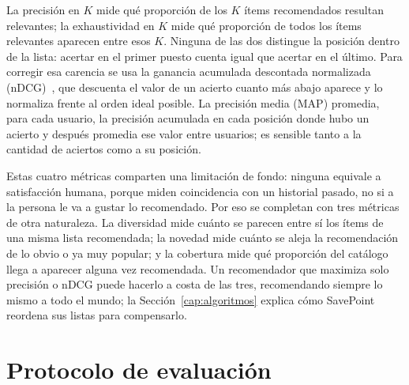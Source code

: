 La precisión en \(K\) mide qué proporción de los \(K\) ítems recomendados resultan relevantes;
la exhaustividad en \(K\) mide qué proporción de todos los ítems relevantes aparecen entre
esos \(K\). Ninguna de las dos distingue la posición dentro de la lista: acertar en el primer
puesto cuenta igual que acertar en el último. Para corregir esa carencia se usa la ganancia
acumulada descontada normalizada (nDCG)~\cite{jarvelin2002cumulated}, que descuenta el valor
de un acierto cuanto más abajo aparece y lo normaliza frente al orden ideal posible. La
precisión media (MAP) promedia, para cada usuario, la precisión acumulada en cada posición
donde hubo un acierto y después promedia ese valor entre usuarios; es sensible tanto a la
cantidad de aciertos como a su posición.

Estas cuatro métricas comparten una limitación de fondo: ninguna equivale a satisfacción
humana, porque miden coincidencia con un historial pasado, no si a la persona le va a gustar lo
recomendado. Por eso se completan con tres métricas de otra naturaleza. La diversidad mide
cuánto se parecen entre sí los ítems de una misma lista recomendada; la novedad mide cuánto se
aleja la recomendación de lo obvio o ya muy popular; y la cobertura mide qué proporción del
catálogo llega a aparecer alguna vez recomendada. Un recomendador que maximiza solo precisión
o nDCG puede hacerlo a costa de las tres, recomendando siempre lo mismo a todo el mundo; la
Sección~\ref{cap:algoritmos} explica cómo SavePoint reordena sus listas para compensarlo.

\section{Protocolo de evaluación}\label{sec:exp-protocolo}

